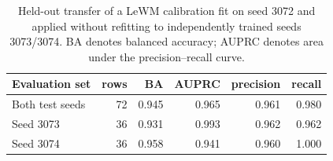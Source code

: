 \begin{table}[t]
\centering
\caption{Held-out transfer of a LeWM calibration fit on seed 3072 and applied without refitting to independently trained seeds 3073/3074. BA denotes balanced accuracy; AUPRC denotes area under the precision--recall curve.}
\label{tab:seed-transfer-audit}
\small
\setlength{\tabcolsep}{5pt}
\begin{tabular}{lrrrrr}
\toprule
Evaluation set & rows & BA & AUPRC & precision & recall \\
\midrule
Both test seeds & 72 & 0.945 & 0.965 & 0.961 & 0.980 \\
Seed 3073 & 36 & 0.931 & 0.993 & 0.962 & 0.962 \\
Seed 3074 & 36 & 0.958 & 0.941 & 0.960 & 1.000 \\
\bottomrule
\end{tabular}
\end{table}
